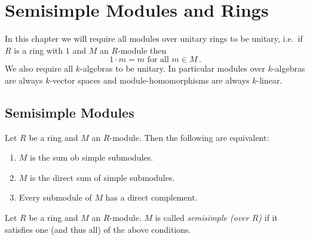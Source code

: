 \chapter{Semisimple Modules and Rings}


In this chapter we will require all modules over unitary rings to be unitary, i.e.\ if $R$ is a ring with $1$ and $M$ an $R$-module then
\[
    1 \cdot m
  = m
  \text{ for all }
  m \in M \,.
\]
We also require all $k$-algebras to be unitary.
In particular modules over $k$-algebras are always $k$-vector spaces and module-homomorphisms are always $k$-linear.





\section{Semisimple Modules}


\begin{prop}\label{prop: characterisation semisimple modules}
  Let $R$ be a ring and $M$ an $R$-module. Then the following are equivalent:
  \begin{enumerate}[label=\emph{\roman*)},leftmargin=*]
    \item \label{enum: sum of simple}
      $M$ is the sum ob simple submodules.
    \item \label{enum: direct sum of simple}
      $M$ is the direct sum of simple submodules. 
    \item \label{enum: direct complements}
      Every submodule of $M$ has a direct complement.
  \end{enumerate}
\end{prop}


\begin{defi}
  Let $R$ be a ring and $M$ an $R$-module.
  $M$ is called \emph{semisimple (over $R$)} if it satisfies one (and thus all) of the above conditions.
\end{defi}


